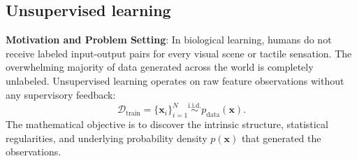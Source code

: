 \subsection{Unsupervised learning}
\label{sec:unsupervised_learning}

\textbf{Motivation and Problem Setting}: In biological learning, humans do not receive labeled input-output pairs for every visual scene or tactile sensation. The overwhelming majority of data generated across the world is completely unlabeled. Unsupervised learning operates on raw feature observations without any supervisory feedback:
\begin{equation}
\mathcal{D}_{\text{train}} = \{\mathbf{x}_i\}_{i=1}^N \overset{\text{i.i.d.}}{\sim} p_{\text{data}}(\mathbf{x}).
\end{equation}
The mathematical objective is to discover the intrinsic structure, statistical regularities, and underlying probability density $p(\mathbf{x})$ that generated the observations.

